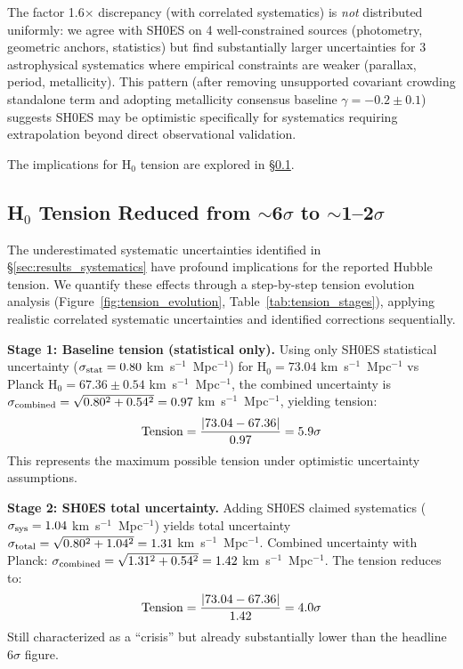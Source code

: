 \documentclass[preprint, linenumbers]{aastex701}
\begin{document}
The factor 1.6$\times$ discrepancy (with correlated systematics) is \textit{not} distributed uniformly: we agree with SH0ES on 4 well-constrained sources (photometry, geometric anchors, statistics) but find substantially larger uncertainties for 3 astrophysical systematics where empirical constraints are weaker (parallax, period, metallicity). This pattern (after removing unsupported covariant crowding standalone term and adopting metallicity consensus baseline $\gamma=-0.2\pm0.1$) suggests SH0ES may be optimistic specifically for systematics requiring extrapolation beyond direct observational validation.

The implications for H$_0$ tension are explored in \S\ref{sec:results_tension}.

\subsection{H$_0$ Tension Reduced from $\sim$6$\sigma$ to $\sim$1--2$\sigma$}
\label{sec:results_tension}

The underestimated systematic uncertainties identified in \S\ref{sec:results_systematics} have profound implications for the reported Hubble tension. We quantify these effects through a step-by-step tension evolution analysis (Figure~\ref{fig:tension_evolution}, Table~\ref{tab:tension_stages}), applying realistic correlated systematic uncertainties and identified corrections sequentially.

\textbf{Stage 1: Baseline tension (statistical only).} Using only SH0ES statistical uncertainty ($\sigma_{\rm stat} = 0.80$ km~s$^{-1}$~Mpc$^{-1}$) for H$_0 = 73.04$ km~s$^{-1}$~Mpc$^{-1}$ \citep{Riess2022} vs Planck H$_0 = 67.36 \pm 0.54$ km~s$^{-1}$~Mpc$^{-1}$, the combined uncertainty is $\sigma_{\rm combined} = \sqrt{0.80^2 + 0.54^2} = 0.97$ km~s$^{-1}$~Mpc$^{-1}$, yielding tension:
\begin{equation}
{\rm Tension} = \frac{|73.04 - 67.36|}{0.97} = 5.9\sigma
\end{equation}
This represents the maximum possible tension under optimistic uncertainty assumptions.

\textbf{Stage 2: SH0ES total uncertainty.} Adding SH0ES claimed systematics ($\sigma_{\rm sys} = 1.04$ km~s$^{-1}$~Mpc$^{-1}$) yields total uncertainty $\sigma_{\rm total} = \sqrt{0.80^2 + 1.04^2} = 1.31$ km~s$^{-1}$~Mpc$^{-1}$. Combined uncertainty with Planck: $\sigma_{\rm combined} = \sqrt{1.31^2 + 0.54^2} = 1.42$ km~s$^{-1}$~Mpc$^{-1}$. The tension reduces to:
\begin{equation}
{\rm Tension} = \frac{|73.04 - 67.36|}{1.42} = 4.0\sigma
\end{equation}
Still characterized as a ``crisis'' but already substantially lower than the headline 6$\sigma$ figure.
\end{document}
